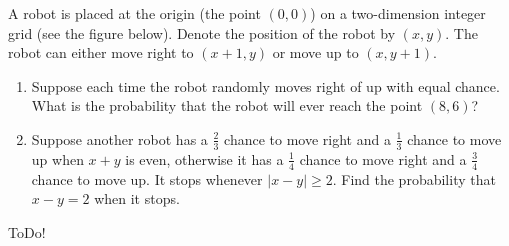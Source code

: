 
\begin{exercise}

A robot is placed at the origin (the point $(0, 0)$) on a two-dimension integer grid (see the figure below).
Denote the position of the robot by $(x, y)$.
The robot can either move right to $(x + 1, y)$ or move up to $(x, y + 1)$.

\begin{center}
    \begin{tikzpicture}
    \end{tikzpicture}
\end{center}

\begin{enumerate}[label = (\alph*)]

    \item Suppose each time the robot randomly moves right of up with equal chance.
    What is the probability that the robot will ever reach the point $(8, 6)$?

    \item Suppose another robot has a $\frac{2}{3}$ chance to move right and a $\frac{1}{3}$ chance to move up when $x + y$ is even, otherwise it has a $\frac{1}{4}$ chance to move right and a $\frac{3}{4}$ chance to move up.
    It stops whenever $|x - y| \geq 2$.
    Find the probability that $x - y = 2$ when it stops.

\end{enumerate}

\end{exercise}


\begin{solution}

ToDo!

\end{solution}

